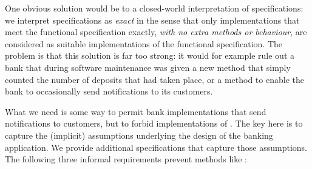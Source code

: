 One obvious solution would be to  %
a closed-world
interpretation of specifications: we interpret  specifications  
as \emph{exact} in the sense that only
implementations that meet the functional specification exactly,
\emph{with no extra methods or behaviour}, are considered as suitable
implementations of the functional specification. The problem is that
this solution is far too strong: it would for example rule out a bank
that  during software maintenance was given a new method 
that simply counted the number of deposits that had taken place, or a method 
to enable the bank to occasionally send notifications  to its customers.
%
%


What we need is some way to permit bank implementations that 
send notifications to customers, but to forbid implementations of . %
The key here is to capture the (implicit)
assumptions underlying %
the design of the banking application.
 We provide
additional specifications that capture those assumptions.  The following
 three informal requirements   prevent methods like :

